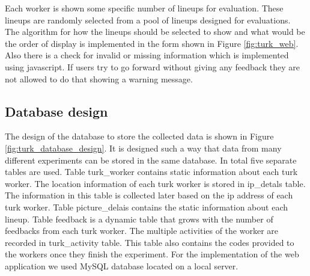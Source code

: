 \documentclass[11pt]{article}
\begin{document}
Each worker is shown some specific number of lineups for evaluation. These lineups are randomly selected from a pool of lineups designed for evaluations. The algorithm for how the lineups should be selected to show and what would be the order of display is implemented in the form shown in Figure \ref{fig:turk_web}. Also there is a check for invalid or missing information which is implemented using javascript. If users try to go forward without giving any feedback they are not allowed to do that showing a warning message.



\subsection{Database design} The design of the database to store the collected data is shown in Figure \ref{fig:turk_database_design}. It is designed such a way that data from many different experiments can be stored in the same database. In total five separate tables are used. Table turk\_worker contains static information about each turk worker. The location information of each turk worker is stored in ip\_detals table. The information in this table is collected later based on the ip address of each turk worker. Table picture\_delais contains the static information about each lineup. Table feedback is a dynamic table that grows with the number of feedbacks from each turk worker. The multiple activities of the worker are recorded in turk\_activity table. This table also contains the codes provided to the workers once they finish the experiment. For the implementation of the web application we used MySQL database located on a local server.
\end{document}
